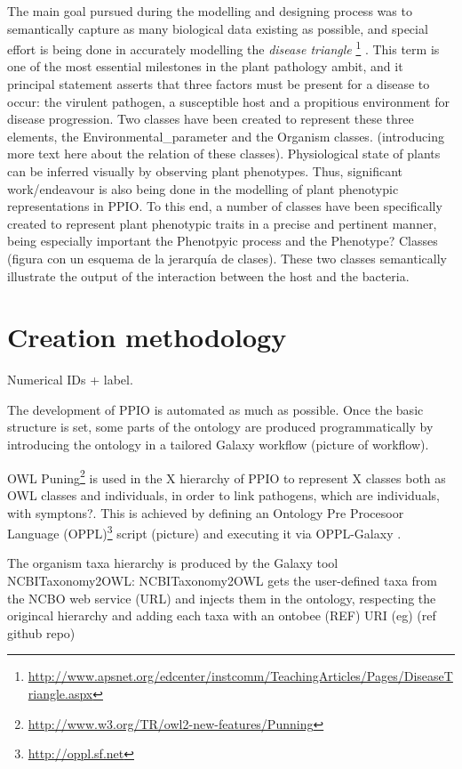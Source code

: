 \documentclass[sw]{iosart2c}
\newcommand{\myurl}[1]{\footnote{\url{#1}}}
\begin{document}
The main goal pursued during the modelling and designing process was to semantically capture as many biological data existing as possible, and special effort is being done in accurately modelling the {\itshape disease triangle} \myurl{http://www.apsnet.org/edcenter/instcomm/TeachingArticles/Pages/DiseaseTriangle.aspx} . This term is one of the most essential milestones in the plant pathology ambit, and it principal statement asserts that three factors must be present for a disease to occur: the virulent pathogen, a susceptible host and a propitious environment for disease progression. Two classes have been created to represent these three elements, the {\sf Environmental\_parameter} and the {\sf Organism} classes. (introducing more text here about the relation of these classes).
Physiological state of plants can be inferred visually by observing plant phenotypes. Thus, significant work/endeavour is also being done in the modelling of plant phenotypic representations in PPIO. To this end, a number of classes have been specifically created to represent plant phenotypic traits in a precise and pertinent manner, being especially important the Phenotpyic process and the Phenotype? Classes (figura con un esquema de la jerarquía de clases). These two classes semantically illustrate the output of the interaction between the host and the bacteria. 


\section{Creation methodology}

Numerical IDs + label.

The development of PPIO is automated as much as possible. Once the basic structure is set, some parts of the ontology are produced programmatically by introducing the ontology in a tailored Galaxy \cite{galaxy} workflow  (picture of workflow). 

OWL Puning\myurl{http://www.w3.org/TR/owl2-new-features/Punning} is used in the X hierarchy of PPIO to represent X classes both as OWL classes and individuals, in order to link pathogens, which are individuals, with symptons?. This is achieved by defining an Ontology Pre Procesoor Language (OPPL)\myurl{http://oppl.sf.net} script (picture) and executing it via OPPL-Galaxy \cite{OPPL-Galaxy-JBMS}.

The organism taxa hierarchy is produced by the Galaxy tool NCBITaxonomy2OWL: NCBITaxonomy2OWL gets the user-defined taxa from the NCBO web service (URL) and injects them in the ontology, respecting the origincal hierarchy and adding each taxa with an ontobee (REF) URI (eg) (ref github repo)
\end{document}
